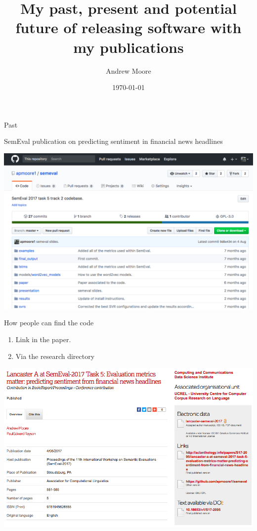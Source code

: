 \documentclass[10pt]{beamer}
\title{My past, present and potential future of releasing software with my publications}
\author{Andrew Moore}
\date{\today}
\institute{School of Computing and Communications, Lancaster University.}
\begin{document}
\maketitle

\begin{frame}{Past}
\begin{block}{SemEval publication on predicting sentiment in financial news headlines\cite{fin_sem}}
\begin{center}
\includegraphics[scale=0.25]{semeval.png}
\end{center}
\end{block}
\end{frame}

\begin{frame}{How people can find the code}
\begin{enumerate}
\item Link in the paper.
\item Via the research directory
\end{enumerate}
\includegraphics[scale=0.25]{publication_code.png}
\end{frame}
\end{document}
